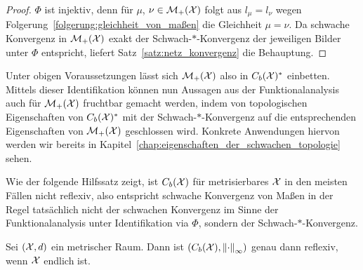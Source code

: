 \documentclass[../thesis/thesis.tex]{subfiles}
\begin{document}
	\begin{proof}
		$\Phi$ ist injektiv, denn für $\mu$, $\nu \in \mathcal{M}_{+}(\mathcal{X})$ folgt aus $l_\mu = l_\nu$ wegen Folgerung~\ref{folgerung:gleichheit_von_maßen} die Gleichheit $\mu = \nu$. 
		Da schwache Konvergenz in $\mathcal{M}_{+}(\mathcal{X})$ exakt der Schwach-$\ast$-Konvergenz der jeweiligen Bilder unter $\Phi$ entspricht, liefert Satz~\ref{satz:netz_konvergenz}
		die Behauptung.
	\end{proof}

	Unter obigen Voraussetzungen lässt sich $\mathcal{M}_{+}(\mathcal{X})$ also in $C_b(\mathcal{X})^\ast$ einbetten. Mittels dieser Identifikation können nun Aussagen aus der 
	Funktionalanalysis auch für $\mathcal{M}_{+}(\mathcal{X})$ fruchtbar gemacht werden, indem von topologischen Eigenschaften von
	$C_b(\mathcal{X})^\ast$ mit der Schwach-$\ast$-Konvergenz auf die entsprechenden Eigenschaften von 
	$\mathcal{M}_{+}(\mathcal{X})$ geschlossen wird. Konkrete Anwendungen hiervon werden wir bereits in Kapitel~\ref{chap:eigenschaften_der_schwachen_topologie} sehen.
	
	Wie der folgende Hilfssatz zeigt, ist $C_b(\mathcal{X})$ für metrisierbares $\mathcal{X}$ in den meisten Fällen nicht reflexiv, also entspricht schwache Konvergenz von Maßen
	in der Regel tatsächlich nicht der schwachen Konvergenz im Sinne der Funktionalanalysis unter Identifikation via $\Phi$, sondern der Schwach-$\ast$-Konvergenz.
	
	\begin{Hilfssatz}
		Sei $(\mathcal{X}, d)$ ein metrischer Raum. Dann ist $(C_b(\mathcal{X}), \left\lVert\cdot\right\rVert_{\infty})$ genau dann reflexiv, wenn $\mathcal{X}$ endlich ist.
	\end{Hilfssatz}
\end{document}
